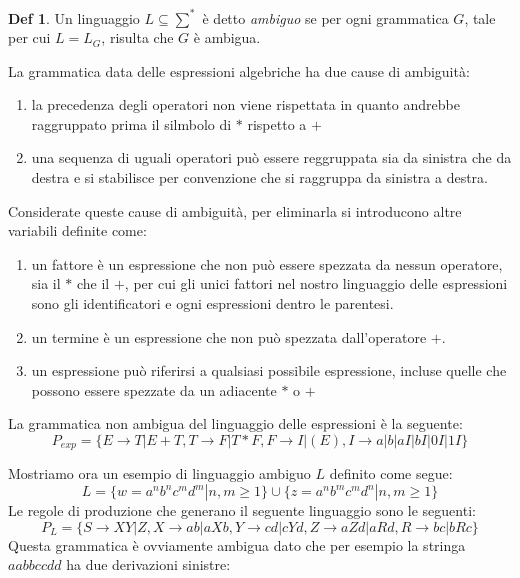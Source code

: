 \documentclass[a4paper]{report}
\theoremstyle{definition}%
\newtheorem*{defi}{Def}%
\begin{document}
  \begin{defi}
    Un linguaggio $L \subseteq \sum^*$ è detto \emph{ambiguo} se per ogni grammatica $G$, tale per cui $L = L_G$, risulta che $G$ è ambigua.
  \end{defi}
  La grammatica data delle espressioni algebriche ha due cause di ambiguità:
  \begin{enumerate}
  \item la precedenza degli operatori non viene rispettata in quanto andrebbe raggruppato prima il silmbolo di $*$ rispetto a $+$
  \item una sequenza di uguali operatori può essere reggruppata sia da sinistra che da destra e si stabilisce per convenzione
    che si raggruppa da sinistra a destra.
  \end{enumerate}
  Considerate queste cause di ambiguità, per eliminarla si introducono altre variabili definite come:
  \begin{enumerate}
  \item un fattore è un espressione che non può essere spezzata da nessun operatore, sia il $*$ che il $+$, per cui gli unici fattori
    nel nostro linguaggio delle espressioni sono gli identificatori e ogni espressioni dentro le parentesi.
  \item un termine è un espressione che non può spezzata dall'operatore $+$.
  \item un espressione può riferirsi a qualsiasi possibile espressione, incluse quelle che possono essere spezzate da un adiacente $*$ o $+$
  \end{enumerate}
  La grammatica non ambigua del linguaggio delle espressioni è la seguente:
  \begin{equation*}
    P_{exp} = \{E \to T | E + T, T \to F | T * F,F \to I | (E), I \to a | b | aI| bI | 0I | 1I\}
  \end{equation*}

  Mostriamo ora un esempio di linguaggio ambiguo $L$ definito come segue:
  \begin{equation*}
    L = \{w = a^nb^nc^md^m | n,m \geq 1\} \cup \{z = a^nb^mc^md^n | n,m \geq 1 \}
  \end{equation*}
  Le regole di produzione che generano il seguente linguaggio sono le seguenti:
  \begin{equation*}
    P_L = \{S \to XY | Z, X \to ab | aXb, Y \to cd | cYd, Z \to aZd | aRd, R \to bc | bRc\}
  \end{equation*}
  Questa grammatica è ovviamente ambigua dato che per esempio la stringa $aabbccdd$ ha due derivazioni sinistre:
\end{document}
